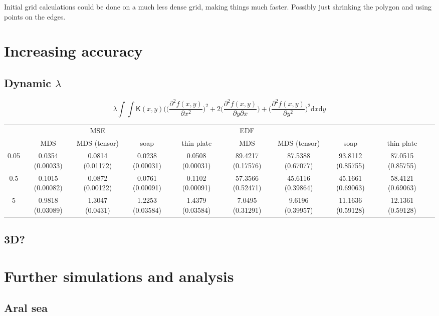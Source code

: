 \documentclass[a4paper,10pt]{article}
\begin{document}
Initial grid calculations could be done on a much less dense grid, making things much faster. Possibly just shrinking the polygon and using points on the edges.


\section{Increasing accuracy}

\subsection{Dynamic $\lambda$}


\begin{equation}
\lambda \int\int \mathsf{K}(x,y) \Big( \Big(\frac{\partial^2 f(x,y)}{\partial x^2}\Big)^2 + 2\Big(\frac{\partial^2 f(x,y)}{\partial y \partial x}\Big) + \Big(\frac{\partial^2 f(x,y)}{\partial y^2}\Big)^2 \text{d}x\text{d}y
\end{equation}


\begin{table}[ht]
\centering
\begin{tabular}{c c c c c c c c c c}
 & & MSE & &  & EDF & \\ 
 & MDS & MDS (tensor) & soap & thin plate & MDS & MDS (tensor) & soap & thin plate\\ 
0.05  & 0.0354 (0.00033) & 0.0814 (0.01172) & 0.0238 (0.00031) &0.0508 (0.00031) &89.4217 (0.17576) & 87.5388 (0.67077) & 93.8112 (0.85755) & 87.0515 (0.85755)\\ 
0.5  & 0.1015 (0.00082) & 0.0872 (0.00122) & 0.0761 (0.00091) &0.1102 (0.00091) &57.3566 (0.52471) & 45.6116 (0.39864) & 45.1661 (0.69063) & 58.4121 (0.69063)\\ 
5  & 0.9818 (0.03089) & 1.3047 (0.0431) & 1.2253 (0.03584) &1.4379 (0.03584) &7.0495 (0.31291) & 9.6196 (0.39957) & 11.1636 (0.59128) & 12.1361 (0.59128)\\ 
\end{tabular}
\end{table}


\subsection{3D?}

\section{Further simulations and analysis}

\subsection{Aral sea}
\end{document}
